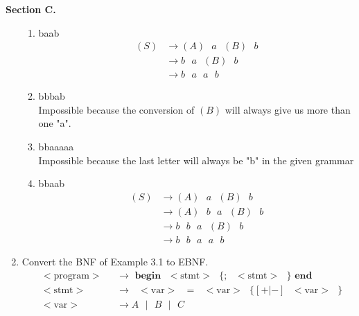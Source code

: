 \documentclass[11pt]{article}
\newcommand{\terminal}[1]{\text{ } <\text{#1}> \text{ }}
\newenvironment{problem}[1]{\textbf{Section #1 }}{}
\begin{document}
\begin{problem}{C.}
\begin{enumerate}
			\begin{enumerate}[label = (\alph*)]
				\item baab 
				\begin{align*}
					(S) &\rightarrow (A) \text{ } a \text{ } (B) \text{ } b \\
					&\rightarrow b \text{ } a \text{ } (B) \text{ } b \\
					&\rightarrow b \text{ } a \text{ } a \text{ } b
				\end{align*}
				\item bbbab 
				\\
				Impossible because the conversion of $(B)$ will always give us more than one "a".
				\item bbaaaaa
				\\
				Impossible because the last letter will always be "b" in the given grammar
				\item bbaab
				\begin{align*}
					(S) &\rightarrow (A) \text{ } a \text{ } (B) \text{ } b \\
					&\rightarrow (A) \text{ } b \text{ } a \text{ } (B) \text{ } b \\
					&\rightarrow b \text{ } b \text{ } a \text{ } (B) \text{ } b \\
					&\rightarrow b \text{ } b \text{ } a \text{ } a \text{ } b
				\end{align*}
			\end{enumerate}
		\item Convert the BNF of Example 3.1 to EBNF.
		\begin{align*}
			\terminal{program} &\rightarrow \textbf{ begin} \terminal{stmt} \{; \terminal{stmt}\} \textbf{ end} \\
			\terminal{stmt} &\rightarrow \terminal{var} = \terminal{var} \{ [+ | -] \terminal{var}\} \\
			\terminal{var} &\rightarrow A \text{ } | \text{ } B \text{ } | \text{ } C
		\end{align*}
		\end{enumerate}
	\end{problem}
\end{document}

